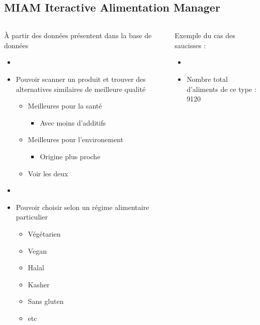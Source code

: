 \subsection{MIAM Iteractive Alimentation Manager}
\begin{frame}{\insertsubsection}
  \begin{columns}[t]
    \begin{column}{.4\textwidth}
      À partir des données présentent dans la base de données
      \begin{itemize}
        \item[]
        \item Pouvoir scanner un produit et trouver des alternatives similaires de meilleure qualité
              \begin{itemize}
                \item Meilleures pour la santé
                      \begin{itemize}
                        \item Avec moins d'additifs
                      \end{itemize}
                \item Meilleures pour l'environement
                      \begin{itemize}
                        \item Origine plus proche
                      \end{itemize}
                \item Voir les deux
              \end{itemize}
        \item[]
        \item Pouvoir choisir selon un régime alimentaire particulier
              \begin{itemize}
                \item Végétarien
                \item Vegan
                \item Halal
                \item Kasher
                \item Sans gluten
                \item etc
              \end{itemize}
      \end{itemize}
    \end{column}
    \begin{column}{.6\textwidth}
      Exemple du cas des saucisses :
      \begin{itemize}
        \item[]
        \item Nombre total d'aliments de ce type : 9120
      \end{itemize}
      \begin{table}
        \small
        
      \end{table}
      \begin{table}
        
      \end{table}
    \end{column}
  \end{columns}
\end{frame}

